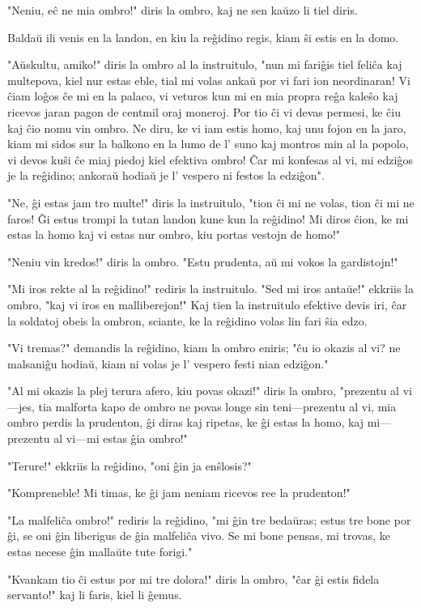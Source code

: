 \documentclass[ngerman,12pt,twoside]{book}
\begin{document}
"Neniu, eĉ ne mia ombro!" diris la ombro, kaj ne sen kaŭzo li tiel diris.

Baldaŭ ili venis en la landon, en kiu la reĝidino regis, kiam ŝi estis en la domo.

"Aŭskultu, amiko!" diris la ombro al la instruitulo, "nun mi fariĝis tiel feliĉa kaj multepova, kiel nur estas eble, tial mi volas ankaŭ por vi fari ion neordinaran! Vi ĉiam loĝos ĉe mi en la palaco, vi veturos kun mi en mia propra reĝa kaleŝo kaj ricevos jaran pagon de centmil oraj moneroj. Por tio ĉi vi devas permesi, ke ĉiu kaj ĉio nomu vin ombro. Ne diru, ke vi iam estis homo, kaj unu fojon en la jaro, kiam mi sidos sur la balkono en la lumo de l' suno kaj montros min al la popolo, vi devos kuŝi ĉe miaj piedoj kiel efektiva ombro! Ĉar mi konfesas al vi, mi edziĝos je la reĝidino; ankoraŭ hodiaŭ je l' vespero ni festos la edziĝon".

"Ne, ĝi estas jam tro multe!" diris la instruitulo, "tion ĉi mi ne volas, tion ĉi mi ne faros! Ĝi estus trompi la tutan landon kune kun la reĝidino! Mi diros ĉion, ke mi estas la homo kaj vi estas nur ombro, kiu portas vestojn de homo!"

"Neniu vin kredos!" diris la ombro. "Estu prudenta, aŭ mi vokos la gardistojn!"

"Mi iros rekte al la reĝidino!" rediris la instruitulo. "Sed mi iros antaŭe!" ekkriis la ombro, "kaj vi iros en malliberejon!" Kaj tien la instruitulo efektive devis iri, ĉar la soldatoj obeis la ombron, sciante, ke la reĝidino volas lin fari ŝia edzo.

"Vi tremas?" demandis la reĝidino, kiam la ombro eniris; "ĉu io okazis al vi? ne malsaniĝu hodiaŭ, kiam ni volas je l' vespero festi nian edziĝon."

"Al mi okazis la plej terura afero, kiu povas okazi!" diris la ombro, "prezentu al vi---jes, tia malforta kapo de ombro ne povas longe sin teni---prezentu al vi, mia ombro perdis la prudenton, ĝi diras kaj ripetas, ke ĝi estas la homo, kaj mi---prezentu al vi---mi estas ĝia ombro!"

"Terure!" ekkriis la reĝidino, "oni ĝin ja enŝlosis?"

"Kompreneble! Mi timas, ke ĝi jam neniam ricevos ree la prudenton!"

"La malfeliĉa ombro!" rediris la reĝidino, "mi ĝin tre bedaŭras; estus tre bone por ĝi, se oni ĝin liberigus de ĝia malfeliĉa vivo. Se mi bone pensas, mi trovas, ke estas necese ĝin mallaŭte tute forigi."

"Kvankam tio ĉi estus por mi tre dolora!" diris la ombro, "ĉar ĝi estis fidela servanto!" kaj li faris, kiel li ĝemus.
\end{document}

